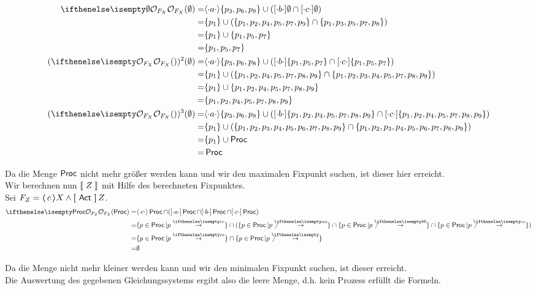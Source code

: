 \begin{align*}
\OSem{F_X}{\emptyset} =&
\possDenot{a} \{ p_3, p_6, p_8\} \cup
( \necessDenot{b} \emptyset \cap \necessDenot{c} \emptyset) \\
=& \{ p_1\} \cup
( \{ p_1, p_2, p_4, p_5, p_7, p_9\} \cap \{ p_1, p_3, p_5, p_7, p_8\} ) \\
=& \{ p_1\} \cup \{ p_1, p_5, p_7\} \\
=& \{ p_1, p_5, p_7\} \\
(\OSem{F_X}{})^2({\emptyset}) =&
\possDenot{a} \{ p_3, p_6, p_8\} \cup
( \necessDenot{b} \{ p_1, p_5, p_7\}  \cap \necessDenot{c} \{ p_1, p_5, p_7\} ) \\
=& \{ p_1\} \cup
( \{ p_1, p_2, p_4, p_5, p_7, p_8, p_9\} \cap \{ p_1, p_2, p_3, p_4, p_5, p_7, p_8, p_9\} )  \\
=& \{ p_1\} \cup
\{ p_1, p_2, p_4, p_5, p_7, p_8, p_9\} \\
=& \{ p_1, p_2, p_4, p_5, p_7, p_8, p_9\} \\
(\OSem{F_X}{})^3({\emptyset}) =&
\possDenot{a} \{ p_3, p_6, p_8\} \cup
(\necessDenot{b} \{ p_1, p_2, p_4, p_5, p_7, p_8, p_9\} \cap
\necessDenot{c} \{ p_1, p_2, p_4, p_5, p_7, p_8, p_9\} ) \\
=& \{ p_1\} \cup
( \{ p_1, p_2, p_3, p_4, p_5, p_6, p_7, p_8, p_9\} \cap
 \{ p_1, p_2, p_3, p_4, p_5, p_6, p_7, p_8, p_9\} )  \\
=& \{ p_1\} \cup \Proc \\
=& \Proc
\end{align*}

Da die Menge $\operatorname{\sf Proc}$ nicht mehr größer werden kann und wir den maximalen Fixpunkt suchen, ist dieser hier erreicht. \\
Wir berechnen nun $\left \llbracket \; Z \; \right \rrbracket$ mit Hilfe des berechneten Fixpunktes. \\
Sei $F_Z = \boldsymbol{\langle} \, c \, \boldsymbol{\rangle} X \land \boldsymbol{[} \, \operatorname{\sf Act} \, \boldsymbol{]}\, Z $. \\

\begin{align*}
\OSem{F_Z}{\Proc} =&
\possDenot{c}\Proc \cap
( \necessDenot{a} \Proc \cap \necessDenot{b} \Proc \cap \necessDenot{c} \Proc) \\
=& \{p \in \Proc | p \CCSTrans{c}\} \cap
(\{p \in \Proc | p \NCCSTrans{a}\} \cap \{p \in \Proc | p \NCCSTrans{b}\} \cap \{p \in \Proc | p \NCCSTrans{c}\}) \\
=& \{p \in \Proc | p \CCSTrans{c}\} \cap
\{p \in \Proc | p \NCCSTrans{}\} \\
=& \emptyset
\end{align*}

Da die Menge nicht mehr kleiner werden kann und wir den minimalen Fixpunkt suchen, ist dieser erreicht. \\

Die Auswertung des gegebenen Gleichungssystems ergibt also die leere Menge, d.h. kein Prozess erfüllt die Formeln.

